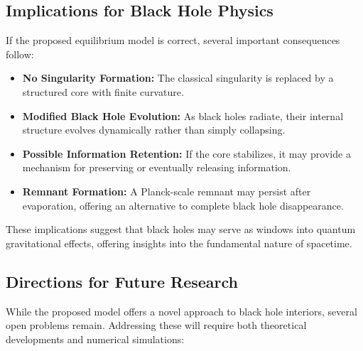 \subsection{Implications for Black Hole Physics}
If the proposed equilibrium model is correct, several important consequences follow:
\begin{itemize}
    \item \textbf{No Singularity Formation:} The classical singularity is replaced by a structured core with finite curvature.
    \item \textbf{Modified Black Hole Evolution:} As black holes radiate, their internal structure evolves dynamically rather than simply collapsing.
    \item \textbf{Possible Information Retention:} If the core stabilizes, it may provide a mechanism for preserving or eventually releasing information.
    \item \textbf{Remnant Formation:} A Planck-scale remnant may persist after evaporation, offering an alternative to complete black hole disappearance.
\end{itemize}

These implications suggest that black holes may serve as windows into quantum gravitational effects, offering insights into the fundamental nature of spacetime.

\subsection{Directions for Future Research}
While the proposed model offers a novel approach to black hole interiors, several open problems remain. Addressing these will require both theoretical developments and numerical simulations:

